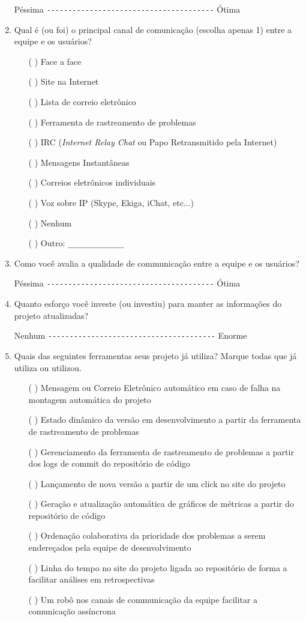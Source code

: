 \begin{enumerate}
  Péssima \verb=---------------------------------------= Ótima

\item Qual é (ou foi) o principal canal de comunicação (escolha apenas
  1) entre a equipe e os usuários?
  \begin{itemize}
  \item[( )] Face a face
  \item[( )] Site na Internet
  \item[( )] Lista de correio eletrônico
  \item[( )] Ferramenta de rastreamento de problemas
  \item[( )] IRC (\textit{Internet Relay Chat} ou Papo Retransmitido
    pela Internet)
  \item[( )] Mensagens Instantâneas
  \item[( )] Correios eletrônicos individuais
  \item[( )] Voz sobre IP (Skype, Ekiga, iChat, etc...)
  \item[( )] Nenhum
  \item[( )] Outro: \verb=_____________=
  \end{itemize}

\item Como você avalia a qualidade de communicação entre a equipe e os
  usuários?

  Péssima \verb=---------------------------------------= Ótima

\item Quanto esforço você investe (ou investiu) para manter as
  informações do projeto atualizadas?

  Nenhum \verb=---------------------------------------= Enorme

\item Quais das seguintes ferramentas seus projeto já utiliza? Marque
  todas que já utiliza ou utilizou.
  \begin{itemize}
  \item[( )] Mensagem ou Correio Eletrônico automático em caso de
    falha na montagem automática do projeto
  \item[( )] Estado dinâmico da versão em desenvolvimento a partir da
    ferramenta de rastreamento de problemas
  \item[( )] Gerenciamento da ferramenta de rastreamento de problemas
    a partir dos logs de commit do repositório de código
  \item[( )] Lançamento de nova versão a partir de um click no site do
    projeto
  \item[( )] Geração e atualização automática de gráficos de métricas
    a partir do repositório de código
  \item[( )] Ordenação colaborativa da prioridade dos problemas a
    serem endereçados pela equipe de desenvolvimento
  \item[( )] Linha do tempo no site do projeto ligada ao repositório
    de forma a facilitar análises em retrospectivas
  \item[( )] Um robô nos canais de communicação da equipe facilitar a
    comunicação assíncrona
  \end{itemize}


\end{enumerate}
